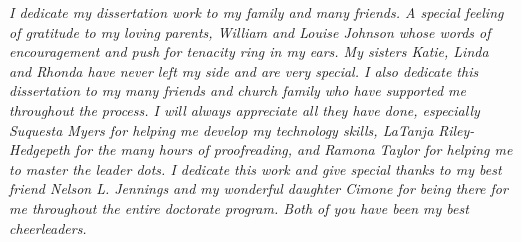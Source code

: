 \documentclass[\main/master.tex]{subfiles}
\begin{document}
\pagestyle{empty}
\begin{center}
\hspace{0pt}
\vfill
\emph{I dedicate my dissertation work to my family and many friends. A special
feeling of gratitude to my loving parents, William and Louise Johnson whose
words of encouragement and push for tenacity ring in my ears. My sisters Katie,
Linda and Rhonda have never left my side and are very special.
 I also dedicate this dissertation to my many friends and church family who have
supported me throughout the process. I will always appreciate all they have done,
especially Suquesta Myers for helping me develop my technology skills, LaTanja
Riley-Hedgepeth for the many hours of proofreading, and Ramona Taylor for
helping me to master the leader dots.
 I dedicate this work and give special thanks to my best friend Nelson L.
Jennings and my wonderful daughter Cimone for being there for me throughout the
entire doctorate program. Both of you have been my best cheerleaders.}
\vfill
\hspace{0pt}
\end{center}
\end{document}
